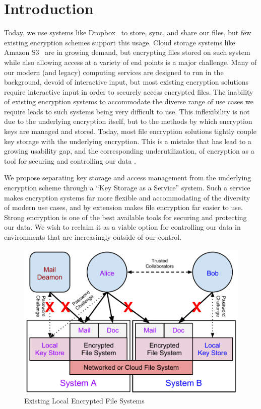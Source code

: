 \section{Introduction}
\label{sec:intro}

Today, we use systems like Dropbox~\cite{dropbox} to store, sync, and
share our files, but few existing encryption schemes support this
usage. Cloud storage systems like Amazon S3~\cite{amazon-s3} are in
growing demand, but encrypting files stored on such system while also
allowing access at a variety of end points is a major challenge. Many
of our modern (and legacy) computing services are designed to run in
the background, devoid of interactive input, but most existing
encryption solutions require interactive input in order to securely
access encrypted files. The inability of existing encryption systems
to accommodate the diverse range of use cases we require leads to such
systems being very difficult to use. This inflexibility is not due to
the underlying encryption itself, but to the methods by which
encryption keys are managed and stored. Today, most file encryption
solutions tightly couple key storage with the underlying
encryption. This is a mistake that has lead to a growing usability
gap, and the corresponding underutilization, of encryption as a tool
for securing and controlling our data \cite{Whitten1999, Sweikata2009,
  Kher2005, Geambasu2011}.

We propose separating key storage and access management from the
underlying encryption scheme through a ``Key Storage as a Service''
system. Such a service makes encryption systems far more flexible and
accommodating of the diversity of modern use cases, and by extension
makes file encryption far easier to use. Strong encryption is one of
the best available tools for securing and protecting our data. We wish
to reclaim it as a viable option for controlling our data in
environments that are increasingly outside of our control.

\begin{figure}[!tb]
  \centering
  \includegraphics[width=\columnwidth]{./include/Problem-Layered.pdf}
  \caption{Existing Local Encrypted File Systems}
  \label{fig:problem-layered}
\end{figure}

